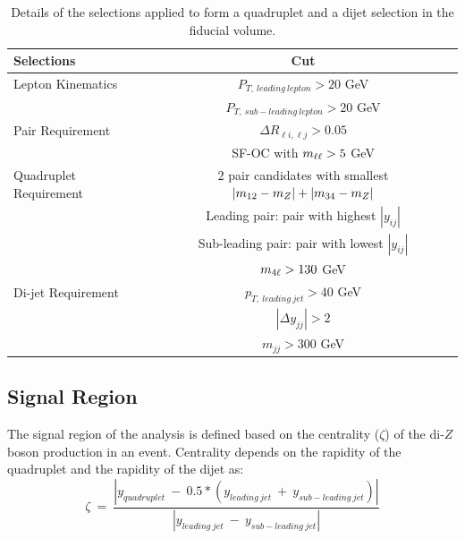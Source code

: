 \begin{table}[ht]
    \caption{Details of the selections applied to form a quadruplet and a dijet selection in the fiducial volume. 
    \label{tab:QuadDijetFidCut}}
    \begin{tabular}{|| l || c ||}
        \hline
        Selections              &           Cut \\
        \hline\hline
        Lepton Kinematics       & $P_{T,~leading~lepton} > 20 $ GeV\\
                                & $P_{T,~sub-leading~lepton} > 20 $ GeV\\
        \hline 
        Pair Requirement        & $\Delta R_{\ell i,\ell     j} > 0.05 $\\
                                & SF-OC with $m_{\ell\ell} > 5$ GeV\\
        \hline
        Quadruplet Requirement  & $2$ pair candidates with smallest $|m_{12}  - m_{Z} | + |m_{34}    - m_{Z} |$  \\
                                & Leading pair: pair with highest $|y_{ij}|$\\
                                & Sub-leading pair: pair with lowest $|y_{ij}|$\\
                                & $m_{4\ell} > 130 $ GeV\\
        \hline
        Di-jet Requirement      & $p_{T,~leading~jet} > 40$ GeV \\
                                & $|\Delta y_{jj}| > 2 $ \\ 
                                & $m_{jj} > 300$ GeV    \\
        \hline
    \end{tabular}
\end{table}

\subsection{Signal Region}
\label{subsec:SignalRegion}
The signal region of the analysis is defined based on the centrality ($\zeta$) of the di-$Z$boson production in an event. Centrality depends on the rapidity of the quadruplet and the rapidity of the dijet as:
\begin{equation}
    \zeta~=~\frac{|y_{quadruplet}~-~ 0.5*(y_{leading~jet}~+~y_{sub-leading~jet})| }{|y_{leading~jet}~-~y_{sub-leading~jet}|}
    \label{eq:centr}
\end{equation}


